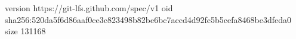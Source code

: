 version https://git-lfs.github.com/spec/v1
oid sha256:520da5f6d86aaf0ce3c823498b82be6bc7accd4d92fc5b5cefa8468be3dfeda0
size 131168

